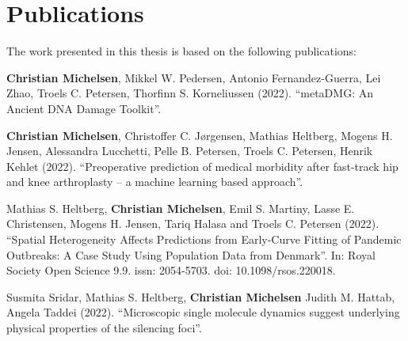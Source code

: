 \chapter{Publications}

The work presented in this thesis is based on the following publications:

\vspace{2cm}





\begin{description} [labelindent=1cm,style=multiline,leftmargin=3cm]
	\item [Paper 1:] \textbf{Christian Michelsen}, Mikkel W. Pedersen, Antonio Fernandez-Guerra, Lei Zhao, Troels C. Petersen, Thorfinn S. Korneliussen (2022). ``metaDMG: An Ancient DNA Damage Toolkit''. \\
	\item [Paper 2:] \textbf{Christian Michelsen}, Christoffer C. Jørgensen, Mathias Heltberg, Mogens H. Jensen, Alessandra Lucchetti, Pelle B. Petersen, Troels C. Petersen, Henrik Kehlet (2022). ``Preoperative prediction of medical morbidity after fast-track hip and knee arthroplasty -- a machine learning based approach''. \\
	\item [Paper 3:] Mathias S. Heltberg, \textbf{Christian Michelsen}, Emil S. Martiny, Lasse E. Christensen, Mogens H. Jensen, Tariq Halasa and Troels C. Petersen (2022). ``Spatial Heterogeneity Affects Predictions from Early-Curve Fitting of Pandemic Outbreaks: A Case Study Using Population Data from Denmark''. In: Royal Society Open Science 9.9. issn: 2054-5703. doi: 10.1098/rsos.220018.  \\
	\item [Paper 4:] Susmita Sridar, Mathias S. Heltberg, \textbf{Christian Michelsen} Judith M. Hattab, Angela Taddei (2022). ``Microscopic single molecule dynamics suggest underlying physical properties of the silencing foci''.
\end{description}


